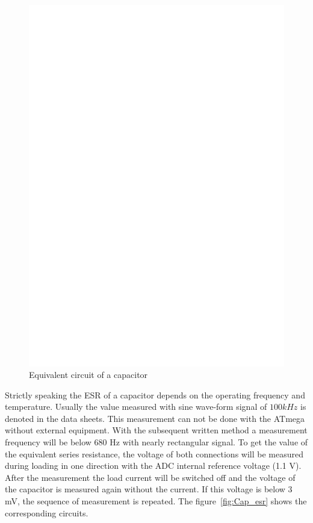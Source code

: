 \begin{figure}[H]
  \centering
    \includegraphics[]{../FIG/Cap_equiv.eps}
  \caption{Equivalent circuit of a capacitor}
  \label{fig:Cap_equiv}
\end{figure}

Strictly speaking the ESR of a capacitor depends on the operating frequency and temperature.
Usually the value measured with sine wave-form signal of \(100 kHz\) is denoted in the data sheets.
This measurement can not be done with the ATmega without external equipment.
With the subsequent written method a measurement frequency will be below 680 Hz with nearly rectangular signal.
To get the value of the equivalent series resistance,
the voltage of both connections will be measured during loading in one direction with the ADC internal reference 
voltage (1.1 V).
After the measurement the load current will be switched off and the voltage of the capacitor is measured
again without the current.
If this voltage is below 3 mV, the sequence of measurement is repeated.
The figure~\ref{fig:Cap_esr} shows the corresponding circuits.

